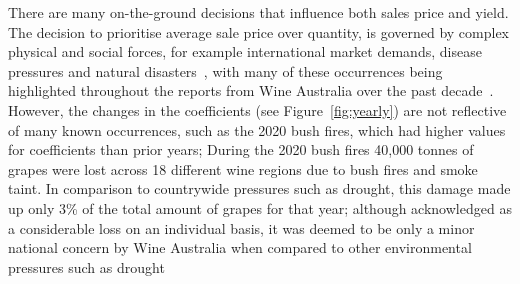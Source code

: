 \documentclass[10pt,letterpaper]{article}
\begin{document}
There are many on-the-ground decisions that influence both sales price and yield. The decision to prioritise average sale price over quantity, is governed by complex physical and social forces, for example international market demands, disease pressures and natural disasters~\cite{abadCoverCropsViticulture2021,cortezUsingDataMining2009,hallWithinseasonTemporalVariation2011,i.goodwinManagingSoilWater2009,kasimatiPredictingGrapeSugar2022,oliverReviewSoilPhysical2013,srivastavaNondestructiveSensingMethods2018}, with many of these occurrences being highlighted throughout the reports from Wine Australia over the past decade~\cite{wineaustraliaNationalVintageReport2019,wineaustraliaNationalVintageReport2021,wineaustraliaNationalVintageReport2022,winemakersfederationofaustraliaNationalVintageReport2013,winemakersfederationofaustraliaNationalVintageReport2014,winemakersfederationofaustraliaNationalVintageReport2015,winemakersfederationofaustraliaNationalVintageReport2016,winemakersfederationofaustraliaNationalVintageReport2017,winemakersfederationofaustraliaNationalVintageReport2018}. However, the changes in the coefficients (see Figure~\ref{fig:yearly}) are not reflective of many known occurrences, such as the 2020 bush fires, which had higher values for coefficients than prior years; During the 2020 bush fires 40,000 tonnes of grapes were lost across 18 different wine regions due to bush fires and smoke taint. In comparison to countrywide pressures such as drought, this damage made up only 3\% of the total amount of grapes for that year; although acknowledged as a considerable loss on an individual basis, it was deemed to be only a minor national concern by Wine Australia when compared to other environmental pressures such as drought~\cite{wineaustraliaNationalVintageReport2020}
\par
\end{document}
